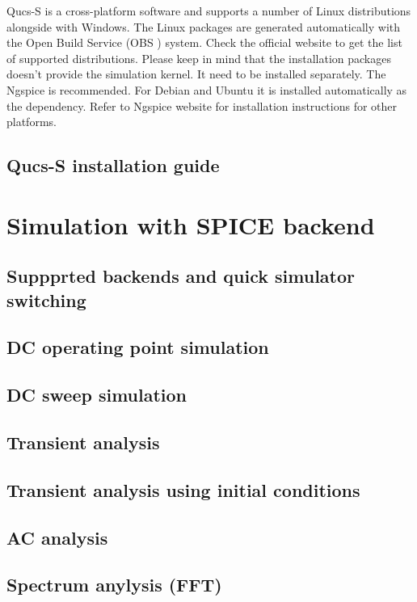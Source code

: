 \documentclass[a4paper,12pt]{article}
\begin{document}
Qucs-S is a cross-platform software and supports a number of Linux distributions alongside with Windows\texttrademark. The Linux packages are generated automatically with the Open Build Service (OBS ) system. Check the official website to get the list of supported distributions. Please keep in mind that the installation packages doesn't provide the simulation kernel. It need to be installed separately. The Ngspice is recommended. For Debian and Ubuntu it is installed automatically as the dependency. Refer to Ngspice website for installation instructions for other platforms.

\subsection{Qucs-S installation guide}

\section{Simulation with SPICE backend}

\subsection{Suppprted backends and quick simulator switching}

\subsection{DC operating point simulation}

\subsection{DC sweep simulation}

\subsection{Transient analysis}

\subsection{Transient analysis using initial conditions}

\subsection{AC analysis}

\subsection{Spectrum anylysis (FFT)}
\end{document}
